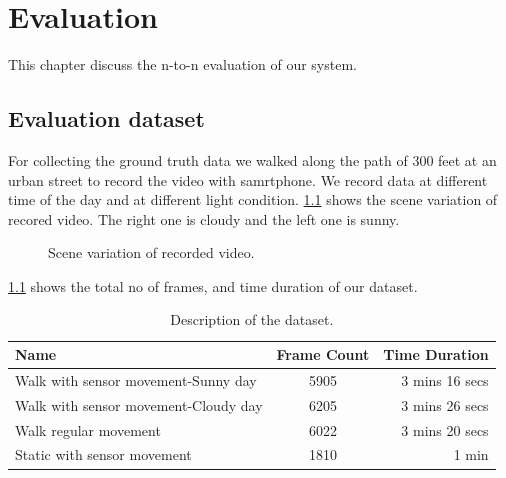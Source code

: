 \chapter{Evaluation}
\label{c:eval}

This chapter discuss the n-to-n evaluation of our system.

\section{Evaluation dataset}
\label{s:eval}
For collecting the ground truth data we walked along the path of 300 feet at an urban street to record the video with samrtphone.
We record data at different time of the day and at different light condition.
\ref{f:dataset} shows the scene variation of recored video.
The right one is cloudy and the left one is sunny.

\begin{figure}[!ht]
\centering
{}
\hfill
{}

\caption{Scene variation of recorded video.}
\label{f:dataset}
\end{figure}

\ref{t:dataset} shows the total no of frames, and time duration of our dataset.

\begin{table}[h!]
  \centering
  \caption{Description of the dataset.}
  \label{t:dataset}
  \begin{tabular}{  l  c  r  }
   
    Name & Frame Count & Time Duration \\
    \hline
    Walk with sensor movement-Sunny day & 5905 & 3 mins 16 secs  \\
    Walk with sensor movement-Cloudy day & 6205 & 3 mins 26 secs \\
    Walk regular movement & 6022 & 3 mins 20 secs \\
    Static with sensor movement & 1810 & 1 min 
    \hline
  \end{tabular}
\end{table}

